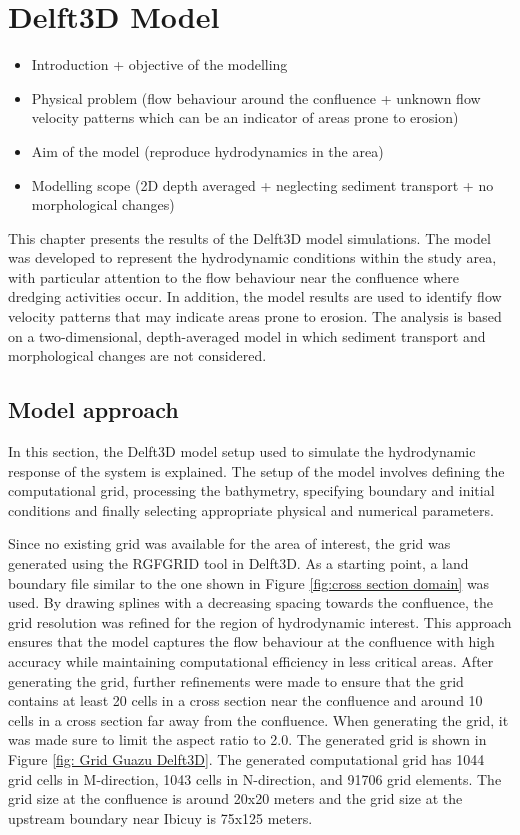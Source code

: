 \chapter{Delft3D Model}
\label{chap:Delft3DModel}

\begin{itemize}
    \item Introduction + objective of the modelling
    \item Physical problem (flow behaviour around the confluence + unknown flow velocity patterns which can be an indicator of areas prone to erosion)
    \item Aim of the model (reproduce hydrodynamics in the area)
    \item Modelling scope (2D depth averaged + neglecting sediment transport + no morphological changes)
\end{itemize}

This chapter presents the results of the Delft3D model simulations. The model was developed to represent the hydrodynamic conditions within the study area, with particular attention to the flow behaviour near the confluence where dredging activities occur. In addition, the model results are used to identify flow velocity patterns that may indicate areas prone to erosion. The analysis is based on a two-dimensional, depth-averaged model in which sediment transport and morphological changes are not considered.



\section{Model approach}
In this section, the Delft3D model setup used to simulate the hydrodynamic response of the system is explained. The setup of the model involves defining the computational grid, processing the bathymetry, specifying boundary and initial conditions and finally selecting appropriate physical and numerical parameters.

Since no existing grid was available for the area of interest, the grid was generated using the RGFGRID tool in Delft3D. As a starting point, a land boundary file similar to the one shown in Figure \ref{fig:cross section domain} was used. By drawing splines with a decreasing spacing towards the confluence, the grid resolution was refined for the region of hydrodynamic interest. This approach ensures that the model captures the flow behaviour at the confluence with high accuracy while maintaining computational efficiency in less critical areas. After generating the grid, further refinements were made to ensure that the grid contains at least 20 cells in a cross section near the confluence and around 10 cells in a cross section far away from the confluence. When generating the grid, it was made sure to limit the aspect ratio to 2.0. The generated grid is shown in Figure \ref{fig: Grid Guazu Delft3D}. The generated computational grid has 1044 grid cells in M-direction, 1043 cells in N-direction, and 91706 grid elements. The grid size at the confluence is around 20x20 meters and the grid size at the upstream boundary near Ibicuy is 75x125 meters. 

